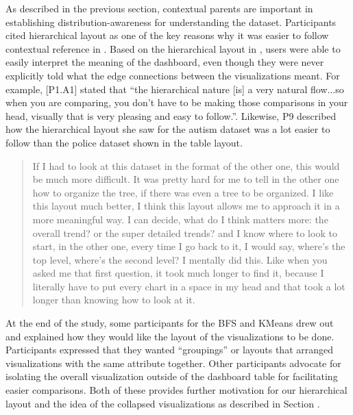 \npar As described in the previous section, contextual parents are important in establishing distribution-awareness for understanding the dataset. Participants cited hierarchical layout as one of the key reasons why it was easier to follow contextual reference in \system. Based on the hierarchical layout in \system, users were able to easily interpret the meaning of the dashboard, even though they were never explicitly told what the edge connections between the visualizations meant. For example, [P1.A1] stated that ``the hierarchical nature [is] a very natural flow...so when you are comparing, you don't have to be making those comparisons in your head, visually that is very pleasing and easy to follow.''. %
Likewise, P9 described how the hierarchical layout she saw for the autism dataset was a lot easier to follow than the police dataset shown in the table layout.
\begin{quote}
If I had to look at this dataset in the format of the other one, this would be much more difficult. It was pretty hard for me to tell in the other one how to organize the tree, if there was even a tree to be organized. I like this layout much better, I think this layout allows me to approach it in a more meaningful way. I can decide, what do I think matters more: the overall trend? or the super detailed trends? and I know where to look to start, in the other one, every time I go back to it, I would say, where's the top level, where's the second level? I mentally did this. Like when you asked me that first question, it took much longer to find it, because I literally have to put every chart in a space in my head and that took a lot longer than knowing how to look at it.
\end{quote}
At the end of the study, some participants for the BFS and KMeans drew out and explained how they would like the layout of the visualizations to be done. Participants expressed that they wanted ``groupings'' or layouts that arranged visualizations with the same attribute together. Other participants advocate for isolating the overall visualization outside of the dashboard table for facilitating easier comparisons. Both of these provides further motivation for our hierarchical layout and the idea of the collapsed visualizations as described in Section \label{sec:interaction}.
